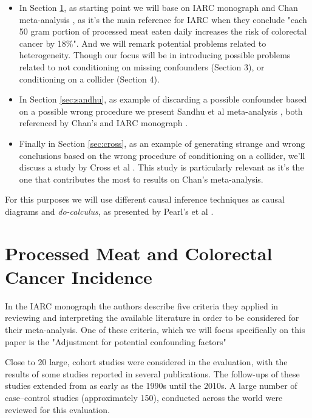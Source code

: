 \documentclass{article}
\begin{document}
\begin{itemize}

\item  In Section \ref{sec:chan}, as starting point we will base on IARC monograph and Chan meta-analysis \cite{chan}, as it's the main reference for IARC when they conclude "each 50 gram portion of processed meat eaten daily increases the risk of colorectal cancer by 18\%". And we will remark potential problems related to heterogeneity. Though our focus will be in introducing possible problems related to not conditioning on missing confounders (Section 3), or conditioning on a collider (Section 4).
\item In Section \ref{sec:sandhu}, as example of discarding a possible confounder based on a possible wrong procedure we present Sandhu et al meta-analysis \cite{sandhu}, both referenced by Chan's \cite{chan} and IARC monograph \cite{monograph}.
\item Finally in Section \ref{sec:cross}, as an example of generating strange and wrong conclusions based on the wrong procedure of conditioning on a collider, we'll discuss a study by Cross et al \cite{cross}. This study is particularly relevant as it's the one that contributes the most to results on Chan's meta-analysis.
\end{itemize}

For this purposes we will use different causal inference techniques as causal diagrams and \textit{do-calculus}, as presented by Pearl's et al \cite{bookofwhy}.

\section{Processed Meat and Colorectal Cancer Incidence}
\label{sec:chan}

In the IARC monograph \cite{monograph} the authors describe five criteria they applied in reviewing and interpreting the available literature in order to be considered for their meta-analysis. One of these criteria, which we will focus specifically on this paper is the "Adjustment for potential confounding factors"


Close to 20 large,
cohort studies were considered in the evaluation, with the results
of some studies reported in several publications.
The follow-ups of these studies extended from as
early as the 1990s until the 2010s. A large number
of case–control studies (approximately 150),
conducted across the world were reviewed for
this evaluation.
\end{document}
